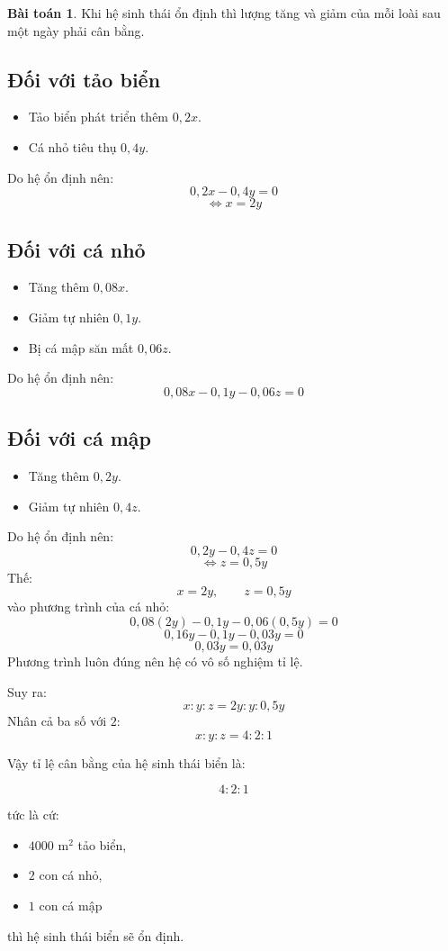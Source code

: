 \documentclass[12pt,a4paper,oneside]{book}
\theoremstyle{theorem}
\theoremstyle{definition}
\newtheorem{bt}[theorem2]{Bài toán}
\begin{document}
\begin{bt}
Khi hệ sinh thái ổn định thì lượng tăng và giảm của mỗi loài sau một ngày
phải cân bằng.

\subsection*{Đối với tảo biển}

\begin{itemize}
    \item Tảo biển phát triển thêm \(0,2x\).
    
    \item Cá nhỏ tiêu thụ \(0,4y\).
\end{itemize}

Do hệ ổn định nên:
\[0,2x-0,4y=0\]
\[\Leftrightarrow x=2y
\]
\subsection*{Đối với cá nhỏ}

\begin{itemize}
    \item Tăng thêm \(0,08x\).

    \item Giảm tự nhiên \(0,1y\).
    
    \item Bị cá mập săn mất \(0,06z\).
\end{itemize}

Do hệ ổn định nên:
\[
0,08x-0,1y-0,06z=0
\]
\subsection*{Đối với cá mập}

\begin{itemize}
    \item Tăng thêm \(0,2y\).
    
    \item Giảm tự nhiên \(0,4z\).
\end{itemize}

Do hệ ổn định nên:
\[
0,2y-0,4z=0
\]
\[
\Leftrightarrow z=0,5y
\]
Thế:
\[
x=2y,\qquad z=0,5y
\]
vào phương trình của cá nhỏ:
\[
0,08(2y)-0,1y-0,06(0,5y)=0
\]
\[
0,16y-0,1y-0,03y=0
\]
\[
0,03y=0,03y
\]
Phương trình luôn đúng nên hệ có vô số nghiệm tỉ lệ.

Suy ra:
\[
x:y:z=2y:y:0,5y
\]
Nhân cả ba số với \(2\):
\[
x:y:z=4:2:1
\]

\bigskip

Vậy tỉ lệ cân bằng của hệ sinh thái biển là:

\[
4:2:1
\]

tức là cứ:

\begin{itemize}
    \item \(4000\text{ m}^2\) tảo biển,
    
    \item \(2\) con cá nhỏ,
    
    \item \(1\) con cá mập
\end{itemize}

thì hệ sinh thái biển sẽ ổn định.
\end{bt}
\end{document}
